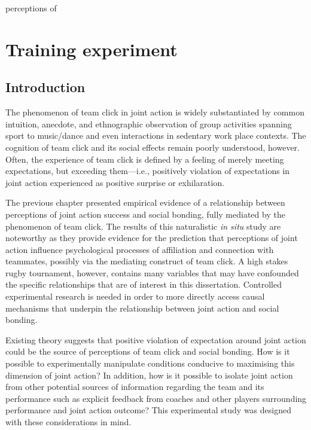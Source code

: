 perceptions of

\begin{savequote}[8cm]

  \qauthor{}
\end{savequote}



\chapter{\label{chap:trainingExperiment}Training experiment}

\minitoc


\section{Introduction}
The phenomenon of team click in joint action is widely substantiated by common intuition, anecdote, and ethnographic observation of group activities spanning sport to music/dance and even interactions in sedentary work place contexts.  The cognition of team click and its social effects remain poorly understood, however.  Often, the experience of team click is defined by a feeling of merely meeting expectations, but exceeding them---i.e., positively violation of expectations in joint action experienced as positive surprise or exhilaration.

The previous chapter presented empirical evidence of a relationship between perceptions of joint action success and social bonding, fully mediated by the phenomenon of team click.  The results of this naturalistic \textit{in situ} study are noteworthy as they provide evidence for the prediction that perceptions of joint action influence psychological processes of affiliation and connection with teammates, possibly via the mediating construct of team click.  A high stakes rugby tournament, however, contains many variables that may have confounded the specific relationships that are of interest in this dissertation.   Controlled experimental research is needed in order to more directly access causal mechanisms that underpin the relationship between joint action and social bonding.

Existing theory suggests that positive violation of expectation around joint action could be the source of perceptions of team click and social bonding. How is it possible to experimentally manipulate conditions conducive to maximising this dimension of joint action? In addition, how is it possible to isolate joint action from other potential sources of information regarding the team and its performance such as explicit feedback from coaches and other players surrounding performance and joint action outcome?  This experimental study was designed with these considerations in mind.

